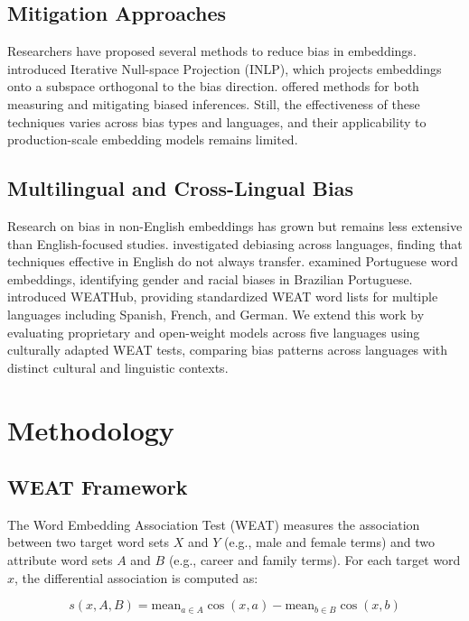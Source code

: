 \documentclass{sbc2019}
\begin{document}
\subsection{Mitigation Approaches}

Researchers have proposed several methods to reduce bias in embeddings. \cite{ravfogel2020inlp} introduced Iterative Null-space Projection (INLP), which projects embeddings onto a subspace orthogonal to the bias direction. \cite{dev2021measuring} offered methods for both measuring and mitigating biased inferences. Still, the effectiveness of these techniques varies across bias types and languages, and their applicability to production-scale embedding models remains limited.

\subsection{Multilingual and Cross-Lingual Bias}

Research on bias in non-English embeddings has grown but remains less extensive than English-focused studies. \cite{lauscher2020we} investigated debiasing across languages, finding that techniques effective in English do not always transfer. \cite{taso2023sexismo} examined Portuguese word embeddings, identifying gender and racial biases in Brazilian Portuguese. \cite{mukherjee2023weathub} introduced WEATHub, providing standardized WEAT word lists for multiple languages including Spanish, French, and German. We extend this work by evaluating proprietary and open-weight models across five languages using culturally adapted WEAT tests, comparing bias patterns across languages with distinct cultural and linguistic contexts.

\section{Methodology}

\subsection{WEAT Framework}

The Word Embedding Association Test (WEAT) \cite{caliskan2017semantics} measures the association between two target word sets $X$ and $Y$ (e.g., male and female terms) and two attribute word sets $A$ and $B$ (e.g., career and family terms). For each target word $x$, the differential association is computed as:

\begin{equation}
    s(x, A, B) = \text{mean}_{a \in A} \cos(x, a) - \text{mean}_{b \in B} \cos(x, b)
\end{equation}
\end{document}
